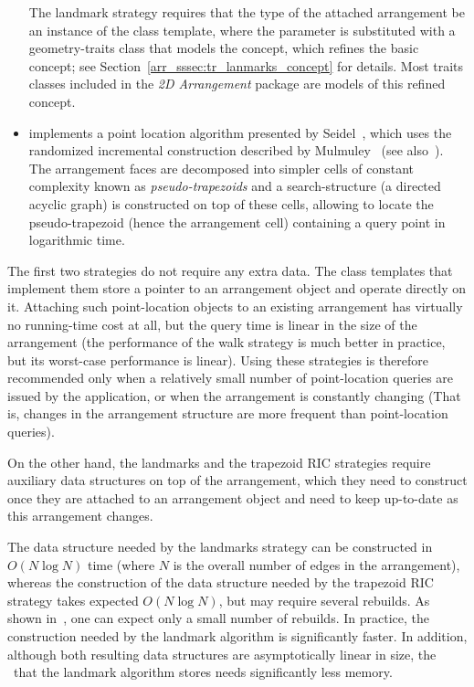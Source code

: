 \begin{itemize}
  The landmark strategy requires that the type of the attached
  arrangement be an instance of the 
  class template, where the  parameter is substituted with
  a geometry-traits class that models the
   concept, which refines the basic
   concept; see
  Section~\ref{arr_sssec:tr_lanmarks_concept} for details. Most traits
  classes included in the \emph{2D Arrangement} package are models of
  this refined concept.
%
\item {} implements
a point location algorithm presented by Seidel~\cite{s-sfira-91}, which uses the 
randomized incremental construction described by Mulmuley~\cite{m-fppa-90} (see
also~\cite[Chapter~6]{bkos-cgaa-00}). The
arrangement faces are decomposed into simpler cells of constant
complexity known as {\em pseudo-trapezoids} and a search-structure
(a directed acyclic graph) is constructed on top of these cells,
allowing to locate the pseudo-trapezoid (hence the arrangement
cell) containing a query point in logarithmic time.
\end{itemize}

The first two strategies do not require any extra data. The class
templates that implement them store a pointer to an arrangement object
and operate directly on it. Attaching such point-location objects to
an existing arrangement has virtually no running-time cost at all, but
the query time is linear in the size of the arrangement (the
performance of the walk strategy is much better in practice, but
its worst-case performance is linear). Using these strategies is
therefore recommended only when a relatively small number of
point-location queries are issued by the application, or when the
arrangement is constantly changing (That is, changes in the arrangement
structure are more frequent than point-location queries).

On the other hand, the landmarks and the trapezoid RIC strategies
require auxiliary data structures on top of the arrangement, which
they need to construct once they are attached to an arrangement
object and need to keep up-to-date as this arrangement changes.

The data structure needed by the landmarks strategy can be constructed
in $O(N \log N)$ time (where $N$ is the overall number of edges in
the arrangement), whereas the construction of the data structure needed 
by the trapezoid RIC strategy takes expected $O(N \log N)$, but 
may require several rebuilds. As shown in~\cite{hkh-iiplgtds-12}, one can 
expect only a small number of rebuilds.
In practice, the construction needed by the landmark algorithm is
significantly faster. 
In addition, although both
resulting data structures are asymptotically linear in size, the
\kdtree\ that the landmark algorithm stores needs significantly
less memory. 

